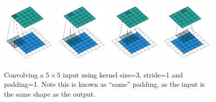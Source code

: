 \documentclass{article}
\begin{document}
\begin{figure}[H]
    \centering
    \includegraphics[width=0.24\textwidth]{pdf/same_padding_no_strides_00.pdf}
    \includegraphics[width=0.24\textwidth]{pdf/same_padding_no_strides_01.pdf}
    \includegraphics[width=0.24\textwidth]{pdf/same_padding_no_strides_02.pdf}
    \includegraphics[width=0.24\textwidth]{pdf/same_padding_no_strides_03.pdf}
    \caption{\label{fig:same_padding_no_strides}
        Convolving a $5 \times 5$ input using kernel size=3, stride=1 and padding=1.
        Note this is known as ``same'' padding, as the input is the same shape as the output.}
\end{figure}
\end{document}
